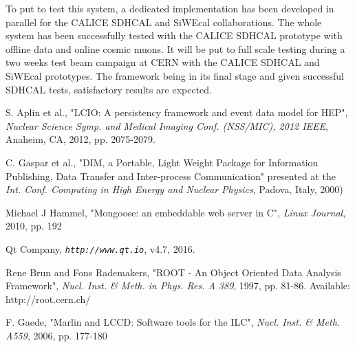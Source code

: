 \documentclass[conference]{IEEEtran}
\begin{document}
To put to test this system, a dedicated implementation has been developed in parallel for the CALICE SDHCAL and SiWEcal collaborations.
The whole system has been successfully tested with the CALICE SDHCAL prototype with offline data and online cosmic muons.  It will be put to full scale testing during a two weeks test beam campaign at CERN with the CALICE SDHCAL and SiWEcal prototypes. The framework being in its final stage and given successful SDHCAL tests, satisfactory results are expected.

\begin{thebibliography}{1}

S. Aplin et al., "LCIO: A persistency framework and event data model for HEP", \emph{Nuclear Science Symp. and Medical Imaging Conf. (NSS/MIC), 2012 IEEE}, Anaheim, CA, 2012, pp. 2075-2079.

C. Gaspar et al., "DIM, a Portable, Light Weight Package for Information Publishing, Data Transfer and Inter-process Communication" presented at the \emph{Int. Conf. Computing in High Energy and Nuclear Physics}, Padova, Italy, 2000)

Michael J Hammel, "Mongoose: an embeddable web server in C", \emph{Linux Journal}, 2010, pp. 192

Qt Company, \emph{\tt http://www.qt.io}, v4.7, 2016.

Rene Brun and Fons Rademakers, "ROOT - An Object Oriented Data Analysis Framework", \emph{Nucl. Inst. \& Meth. in Phys. Res. A 389}, 1997, pp. 81-86. Available: http://root.cern.ch/

F. Gaede,  "Marlin and LCCD: Software tools for the ILC", \emph{Nucl. Inst. \& Meth. A559}, 2006, pp. 177-180

\end{thebibliography}
\end{document}
